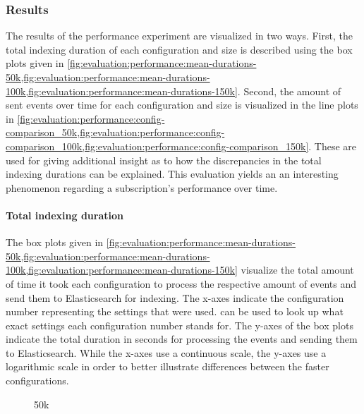 \subsubsection{Results}

The results of the performance experiment are visualized in two ways.
First, the total indexing duration of each configuration and size is described using the box plots given in \cref{fig:evaluation:performance:mean-durations-50k,fig:evaluation:performance:mean-durations-100k,fig:evaluation:performance:mean-durations-150k}.
Second, the amount of sent events over time for each configuration and size is visualized in the line plots in \cref{fig:evaluation:performance:config-comparison_50k,fig:evaluation:performance:config-comparison_100k,fig:evaluation:performance:config-comparison_150k}.
These are used for giving additional insight as to how the discrepancies in the total indexing durations can be explained.
This evaluation yields an an interesting phenomenon regarding a subscription's performance over time.

\paragraph{Total indexing duration}

The box plots given in \cref{fig:evaluation:performance:mean-durations-50k,fig:evaluation:performance:mean-durations-100k,fig:evaluation:performance:mean-durations-150k} visualize the total amount of time it took each configuration to process the respective amount of events and send them to Elasticsearch for indexing.
The x-axes indicate the configuration number representing the settings that were used.
 can be used to look up what exact settings each configuration number stands for.
The y-axes of the box plots indicate the total duration in seconds for processing the events and sending them to Elasticsearch.
While the x-axes use a continuous scale, the y-axes use a logarithmic scale in order to better illustrate differences between the faster configurations.

\begin{figure}[h]
        \caption{50k}
        \label{fig:evaluation:performance:mean-durations-50k}
\end{figure}

